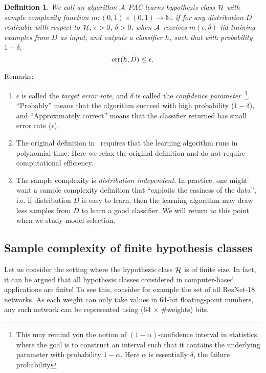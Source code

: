 \documentclass{article}
\newtheorem{definition}{Definition}
\DeclareMathOperator*{\err}{{\rm err}}
\DeclareMathOperator*{\Hcal}{{\cal H}}
\DeclareMathOperator*{\Acal}{{\cal A}}
\newcommand{\NN}{\mathbb{N}}
\begin{document}
\begin{definition}
We call an algorithm $\Acal$ PAC learns hypothesis class $\Hcal$ with sample complexity
function $m: (0,1) \times (0,1) \to \NN$, if for any distribution $D$ realizable with respect to $\Hcal$, $\epsilon > 0$, $\delta > 0$,
when $\Acal$ receives $m(\epsilon, \delta)$ iid training examples from $D$ as input,
 and outputs
a classifier $h$, such that with probability $1-\delta$,
\[ \err(h, D) \leq \epsilon. \]
\end{definition}

Remarks:
\begin{enumerate}
\item $\epsilon$ is called the {\em target error rate}, and $\delta$ is called the {\em confidence parameter}~\footnote{This may remind you the notion of $(1-\alpha)$-confidence interval in statistics, where the goal is to construct an interval such that it contains the underlying parameter with probability $1-\alpha$. Here $\alpha$ is essentially $\delta$, the failure probability}. ``Probably'' means that the algorithm succeed with high probability ($1-\delta$),
and ``Approximately correct'' means that the classifier returned has small error rate ($\epsilon$).
\item The original definition in~\cite{valiant1984theory} requires that the learning algorithm runs in polynomial time. Here we relax the original definition and do not require computational efficiency.
\item The sample complexity is {\em distribution independent}. In practice, one might want a sample complexity definition that ``exploits the easiness of the data'', i.e. if distribution $D$ is easy to learn, then the learning algorithm may draw less samples from $D$ to learn a good classifier. We will return to this point when we study model selection.
\end{enumerate}

\subsection{Sample complexity of finite hypothesis classes}
Let us consider the setting where the hypothesis class $\Hcal$ is of finite size. In fact,
it can be argued that all hypothesis classes considered in computer-based applications are finite! To see this, consider for example the set of all ResNet-18 networks. As each weight can only take values in 64-bit floating-point numbers, any such network can be represented using (64 $\times$ \#weights) bits.
\end{document}
